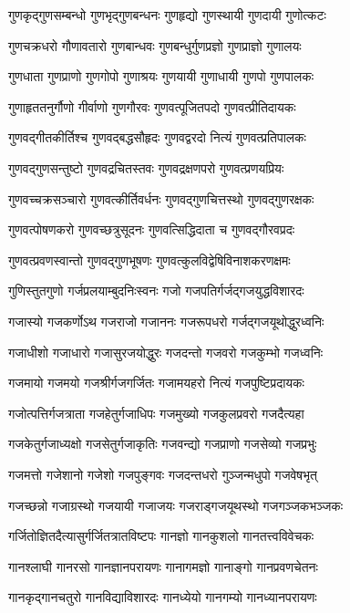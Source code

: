 \twolineshloka
{गुणकृद्गुणसम्बन्धो गुणभृद्गुणबन्धनः}%
{गुणहृद्यो गुणस्थायी गुणदायी गुणोत्कटः}%

\twolineshloka
{गुणचक्रधरो गौणावतारो गुणबान्धवः}%
{गुणबन्धुर्गुणप्रज्ञो गुणप्राज्ञो गुणालयः}%

\twolineshloka
{गुणधाता गुणप्राणो गुणगोपो गुणाश्रयः}%
{गुणयायी गुणाधायी गुणपो गुणपालकः}%

\twolineshloka
{गुणाहृततनुर्गौणो गीर्वाणो गुणगौरवः}%
{गुणवत्पूजितपदो गुणवत्प्रीतिदायकः}%

\twolineshloka
{गुणवद्गीतकीर्तिश्च गुणवद्बद्धसौहृदः}%
{गुणवद्वरदो नित्यं गुणवत्प्रतिपालकः}%

\twolineshloka
{गुणवद्गुणसन्तुष्टो गुणवद्रचितस्तवः}%
{गुणवद्रक्षणपरो गुणवत्प्रणयप्रियः}%

\twolineshloka
{गुणवच्चक्रसञ्चारो गुणवत्कीर्तिवर्धनः}%
{गुणवद्गुणचित्तस्थो गुणवद्गुणरक्षकः}%

\twolineshloka
{गुणवत्पोषणकरो गुणवच्छत्रुसूदनः}%
{गुणवत्सिद्धिदाता च गुणवद्गौरवप्रदः}%

\twolineshloka
{गुणवत्प्रवणस्वान्तो गुणवद्गुणभूषणः}%
{गुणवत्कुलविद्वेषिविनाशकरणक्षमः}%

\twolineshloka
{गुणिस्तुतगुणो गर्जप्रलयाम्बुदनिःस्वनः}%
{गजो गजपतिर्गर्जद्गजयुद्धविशारदः}%

\twolineshloka
{गजास्यो गजकर्णोऽथ गजराजो गजाननः}%
{गजरूपधरो गर्जद्गजयूथोद्धुरध्वनिः}%

\twolineshloka
{गजाधीशो गजाधारो गजासुरजयोद्धुरः}%
{गजदन्तो गजवरो गजकुम्भो गजध्वनिः}%

\twolineshloka
{गजमायो गजमयो गजश्रीर्गजगर्जितः}%
{गजामयहरो नित्यं गजपुष्टिप्रदायकः}%

\twolineshloka
{गजोत्पत्तिर्गजत्राता गजहेतुर्गजाधिपः}%
{गजमुख्यो गजकुलप्रवरो गजदैत्यहा}%

\twolineshloka
{गजकेतुर्गजाध्यक्षो गजसेतुर्गजाकृतिः}%
{गजवन्द्यो गजप्राणो गजसेव्यो गजप्रभुः}%

\twolineshloka
{गजमत्तो गजेशानो गजेशो गजपुङ्गवः}%
{गजदन्तधरो गुञ्जन्मधुपो गजवेषभृत्}%

\twolineshloka
{गजच्छन्नो गजाग्रस्थो गजयायी गजाजयः}%
{गजराड्गजयूथस्थो गजगञ्जकभञ्जकः}%

\twolineshloka
{गर्जितोज्ञितदैत्यासुर्गर्जितत्रातविष्टपः}%
{गानज्ञो गानकुशलो गानतत्त्वविवेचकः}%

\twolineshloka
{गानश्लाघी गानरसो गानज्ञानपरायणः}%
{गानागमज्ञो गानाङ्गो गानप्रवणचेतनः}%

\twolineshloka
{गानकृद्गानचतुरो गानविद्याविशारदः}%
{गानध्येयो गानगम्यो गानध्यानपरायणः}%

